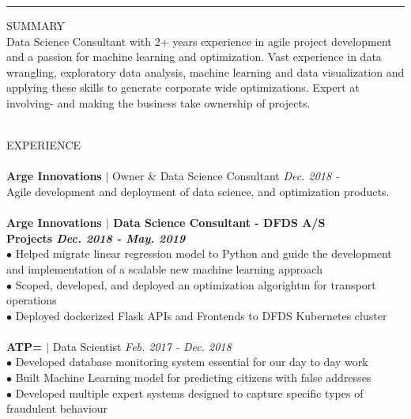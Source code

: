 \documentclass[10pt,a4paper]{article}
\newcommand{\newprojects}[3]{\\\textbf{#1}\\#2\\ \makebullet{#3}\\}
\begin{document}
\vspace{0.3cm}
\hrule
\vspace{0.5cm}
{\Large \textcolor[HTML]{999999}{SUMMARY}}\\
Data Science Consultant with 2+ years experience in agile project development and a passion for machine learning and optimization. Vast experience in data wrangling, exploratory data analysis, machine learning and data visualization and applying these skills to generate corporate wide optimizations. Expert at involving- and making the business take ownership of projects.\\
\vspace{0.3cm}
\\
  \begin{minipage}[t]{0.66\linewidth}
    {\Large \textcolor[HTML]{777777}{EXPERIENCE}}\\
    \vspace{-8pt}\\
    \textbf{Arge Innovations} $|$ Owner \& Data Science Consultant \hfill \textit{Dec. 2018 -} \\
    Agile development and deployment of data science, and optimization products.\\
    \newprojects{Arge Innovations $|$ Data Science Consultant - DFDS A/S \\ Projects \hfill \textmd{\textit{Dec. 2018 - May. 2019}}}{$\bullet$ Helped migrate linear regression model to Python and guide the development and implementation of a scalable new machine learning approach \\ $\bullet$ Scoped, developed, and deployed an optimization algorightm for transport operations \\ $\bullet$ Deployed dockerized Flask APIs and Frontends to DFDS Kubernetes cluster}{}
    \textbf{ATP=} $|$ Data Scientist \hfill \textit{Feb. 2017 - Dec. 2018} \\
    $\bullet$ Developed database monitoring system essential for our day to day work\\
    $\bullet$ Built Machine Learning model for predicting citizens with false addresses\\
    $\bullet$ Developed multiple expert systems designed to capture specific types of fraudulent behaviour\\
    \\

\end{minipage}
\end{document}
